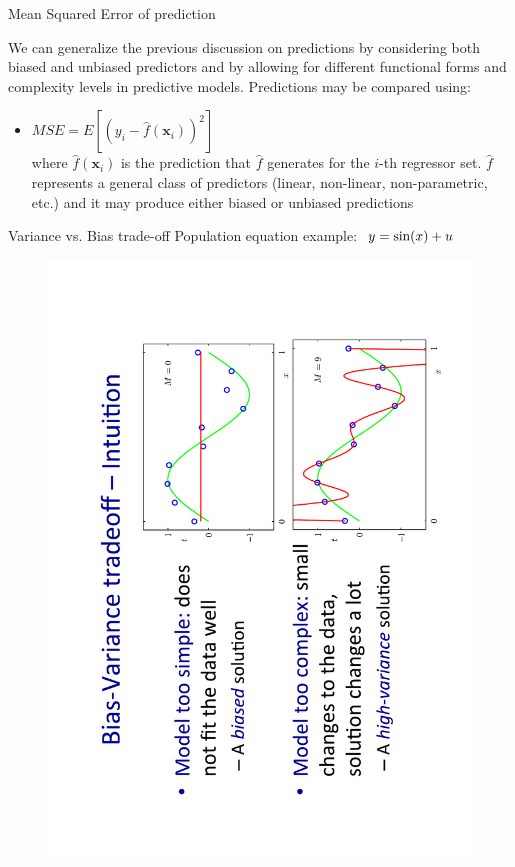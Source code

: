 \documentclass{beamer}
\begin{document}
\begin{frame}{Mean Squared Error of prediction}

We can generalize the previous discussion on predictions by considering both biased and unbiased predictors and by allowing for different functional forms and complexity levels in predictive models. Predictions may be compared using:

\medskip
\begin{itemize}
   \item $\textit{MSE} = E
   \left[ \left( y_i - \hat{f}(\bm{x}_i) \right)^2 \right]$\\
   \smallskip
   where $\hat{f}(\bm{x}_i)$ is the prediction that $\hat{f}$ generates for the $i$-th regressor set. $\hat{f}$ represents a general class of predictors (linear, non-linear, non-parametric, etc.) and it may produce either biased or unbiased predictions
\end{itemize}
\end{frame}
\begin{frame}{Variance vs. Bias trade-off}
Population equation example: $~y = \textnormal{sin}(x)+u$
\vspace{-1cm}
\begin{figure}
\includegraphics[angle=270,scale=0.35]{img/VarBias.pdf}
\end{figure}
\end{frame}
\end{document}
